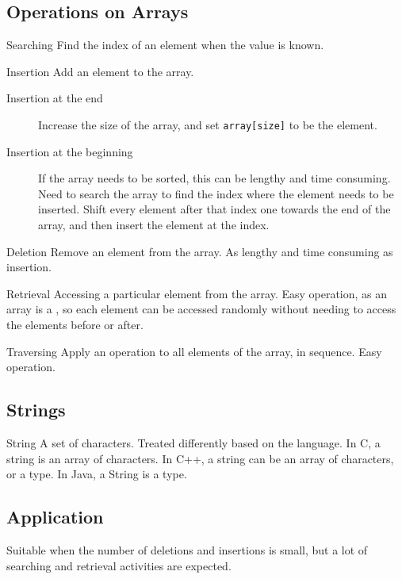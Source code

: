 \documentclass[\main/notes.tex]{subfiles}
\begin{document}
			\subsection{Operations on Arrays}
				\begin{definition}{Searching}
					Find the index of an element when the value is known.
				\end{definition}
				\pagebreak
				\begin{definition}{Insertion}
					Add an element to the array.
					\begin{description}
						\item[Insertion at the end] Increase the size of the array, and set \texttt{array[size]} to be the element.
						\item[Insertion at the beginning] If the array needs to be sorted, this can be lengthy and time consuming. Need to search the array to find the index where the element needs to be inserted. Shift every element after that index one towards the end of the array, and then insert the element at the index.
					\end{description}
				\end{definition}
				\begin{definition}{Deletion}
					Remove an element from the array. As lengthy and time consuming as insertion.
				\end{definition}
				\begin{definition}{Retrieval}
					Accessing a particular element from the array. Easy operation, as an array is a , so each element can be accessed randomly without needing to access the elements before or after.
				\end{definition}
				\begin{definition}{Traversing}
					Apply an operation to all elements of the array, in sequence. Easy operation.
				\end{definition}
			\subsection{Strings}
				\begin{definition}{String}
					A set of characters. Treated differently based on the language. In C, a string is an array of characters. In C++, a string can be an array of characters, or a type. In Java, a String is a type.
				\end{definition}
			\subsection{Application}
				Suitable when the number of deletions and insertions is small, but a lot of searching and retrieval activities are expected.
\end{document}
